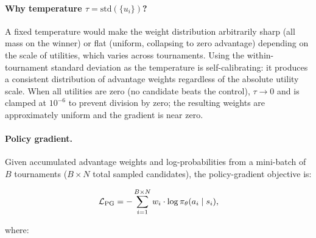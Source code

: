 \paragraph{Why temperature $\tau = \mathrm{std}(\{u_i\})$?}
A fixed temperature would make the weight distribution arbitrarily sharp
(all mass on the winner) or flat (uniform, collapsing to zero advantage)
depending on the scale of utilities, which varies across tournaments.
Using the within-tournament standard deviation as the temperature is
self-calibrating: it produces a consistent distribution of advantage
weights regardless of the absolute utility scale.
When all utilities are zero (no candidate beats the control), $\tau \to 0$
and is clamped at $10^{-6}$ to prevent division by zero; the resulting
weights are approximately uniform and the gradient is near zero.

\paragraph{Policy gradient.}

Given accumulated advantage weights and log-probabilities
from a mini-batch of $B$ tournaments
($B \times N$ total sampled candidates), the
policy-gradient objective is:

\begin{equation}
\mathcal{L}_{\mathrm{PG}}
=
-
\sum_{i=1}^{B \times N}
w_i \cdot
\log \pi_\theta(a_i \mid s_i), \notag
\label{eq:tspo_pg}
\end{equation}

where:

